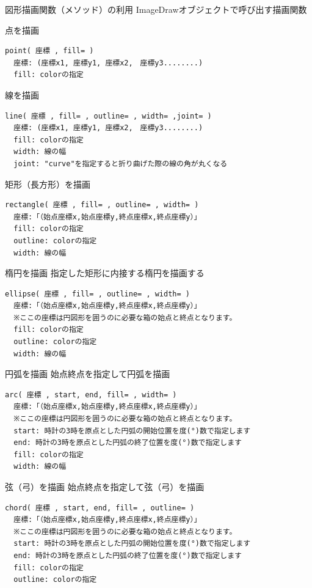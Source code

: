 \documentclass[11pt,a4paper,dvipdfmx,titlepage]{jsreport}
\begin{document}
\begin{grabox}{図形描画関数（メソッド）の利用}
ImageDrawオブジェクトで呼び出す描画関数

\begin{codebox}{点を描画}
\begin{verbatim}
point( 座標 , fill= )
  座標: (座標x1, 座標y1, 座標x2,　座標y3........)
  fill: colorの指定
\end{verbatim}
\end{codebox}
\begin{codebox}{線を描画}
\begin{verbatim}
line( 座標 , fill= , outline= , width= ,joint= )
  座標: (座標x1, 座標y1, 座標x2,　座標y3........)
  fill: colorの指定
  width: 線の幅
  joint: "curve"を指定すると折り曲げた際の線の角が丸くなる
\end{verbatim}
\end{codebox}

\begin{codebox}{矩形（長方形）を描画}
\begin{verbatim}
rectangle( 座標 , fill= , outline= , width= )
  座標:「（始点座標x,始点座標y,終点座標x,終点座標y）」
  fill: colorの指定
  outline: colorの指定
  width: 線の幅
\end{verbatim}
\end{codebox}
\begin{codebox}{楕円を描画}
指定した矩形に内接する楕円を描画する
\begin{verbatim}
ellipse( 座標 , fill= , outline= , width= )
  座標:「（始点座標x,始点座標y,終点座標x,終点座標y）」
  ※ここの座標は円図形を囲うのに必要な箱の始点と終点となります。
  fill: colorの指定
  outline: colorの指定
  width: 線の幅
\end{verbatim}
\end{codebox}
\begin{codebox}{円弧を描画}
始点終点を指定して円弧を描画
\begin{verbatim}
arc( 座標 , start, end, fill= , width= )
  座標:「（始点座標x,始点座標y,終点座標x,終点座標y）」
  ※ここの座標は円図形を囲うのに必要な箱の始点と終点となります。
  start: 時計の3時を原点とした円弧の開始位置を度(°)数で指定します
  end: 時計の3時を原点とした円弧の終了位置を度(°)数で指定します
  fill: colorの指定
  width: 線の幅
\end{verbatim}
\end{codebox}
\begin{codebox}{弦（弓）を描画}
始点終点を指定して弦（弓）を描画
\begin{verbatim}
chord( 座標 , start, end, fill= , outline= )
  座標:「（始点座標x,始点座標y,終点座標x,終点座標y）」
  ※ここの座標は円図形を囲うのに必要な箱の始点と終点となります。
  start: 時計の3時を原点とした円弧の開始位置を度(°)数で指定します
  end: 時計の3時を原点とした円弧の終了位置を度(°)数で指定します
  fill: colorの指定
  outline: colorの指定
\end{verbatim}
\end{codebox}
\end{grabox}
\end{document}
